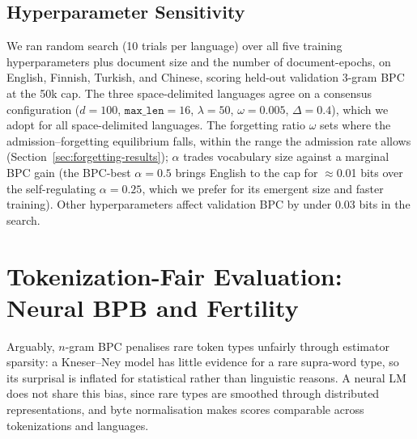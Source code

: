 \documentclass[pdflatex,sn-apa]{sn-jnl}
\begin{document}
\subsection{Hyperparameter Sensitivity}
\label{sec:hparam}

We ran random search (10 trials per language) over all five training
hyperparameters plus document size and the number of document-epochs, on
English, Finnish, Turkish, and Chinese, scoring held-out validation 3-gram BPC
at the 50k cap.
The three space-delimited languages agree on a consensus configuration
($d{=}100$, $\texttt{max\_len}{=}16$, $\lambda{=}50$, $\omega{=}0.005$,
$\Delta{=}0.4$), which we adopt for all space-delimited languages.
The forgetting ratio $\omega$ sets where the admission--forgetting equilibrium
falls, within the range the admission rate allows
(Section~\ref{sec:forgetting-results});
$\alpha$ trades vocabulary size against a marginal BPC gain (the
BPC-best $\alpha{=}0.5$ brings English to the cap for $\approx$0.01 bits over
the self-regulating $\alpha{=}0.25$, which we prefer for its emergent size
and faster training).
Other hyperparameters affect validation BPC by under 0.03 bits in the
search.


\section{Tokenization-Fair Evaluation: Neural BPB and Fertility}
\label{sec:bpb}

Arguably, $n$-gram BPC penalises rare token types unfairly through estimator sparsity: a
Kneser--Ney model has little evidence for a rare supra-word type, so its
surprisal is inflated for statistical rather than linguistic reasons.
A neural LM does not share this bias, since rare types are smoothed
through distributed representations, and byte normalisation makes scores
comparable
across tokenizations and languages.
\end{document}
